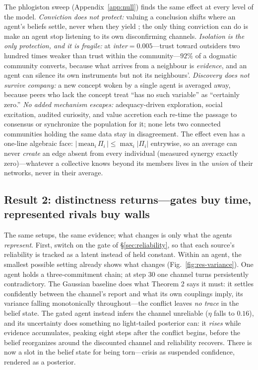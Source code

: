 \documentclass[runningheads]{llncs}
\begin{document}
The phlogiston sweep (Appendix~\ref{app:null}) finds the same effect at every level of the
model. \emph{Conviction does not protect:} valuing a conclusion shifts where an agent's
beliefs settle, never when they yield \citep{hyland2025}; the only thing conviction can do is
make an agent stop listening to its own disconfirming channels. \emph{Isolation is the only
protection, and it is fragile:} at \emph{inter}$=0.005$---trust toward outsiders two hundred
times weaker than trust within the community---$92\%$ of a dogmatic community converts,
because what arrives from a neighbour is \emph{evidence}, and an agent can silence its own
instruments but not its neighbours'. \emph{Discovery does not survive company:} a new concept
woken by a single agent is averaged away, because peers who lack the concept treat ``has no
such variable'' as ``certainly zero.'' \emph{No added mechanism escapes:} adequacy-driven
exploration, social excitation, audited curiosity, and value accretion each re-time the
passage to consensus or synchronize the population for it; none lets two connected communities
holding the same data stay in disagreement. The effect even has a one-line algebraic face:
$|\,\mathrm{mean}_i\,\Pi_i\,|\le\max_i|\Pi_i|$ entrywise, so an average can never
\emph{create} an edge absent from every individual (measured synergy exactly zero)---whatever
a collective knows beyond its members lives in the \emph{union} of their networks, never in
their average.

\subsection{Result 2: distinctness returns---gates buy time, represented rivals buy walls}
\label{sec:res-distinct}

The same setups, the same evidence; what changes is only what the agents \emph{represent}.
First, switch on the gate of \S\ref{sec:reliability}, so that each source's reliability is
tracked as a latent instead of held constant.
Within an agent, the smallest possible setting already shows what changes
(Fig.~\ref{fig:res-variance}). One agent holds a three-commitment chain; at step $30$ one
channel turns persistently contradictory. The Gaussian baseline does what Theorem 2 says it
must: it settles confidently between the channel's report and what its own couplings imply, its
variance falling monotonically throughout---the conflict leaves \emph{no trace} in the belief
state. The gated agent instead infers the channel unreliable ($\eta$ falls to $0.16$), and
its uncertainty does something no light-tailed posterior can: it \emph{rises} while evidence
accumulates, peaking eight steps after the conflict begins, before the belief reorganizes
around the discounted channel and reliability recovers. There is now a slot in the belief
state for being torn---crisis as suspended confidence, rendered as a posterior.
\end{document}
